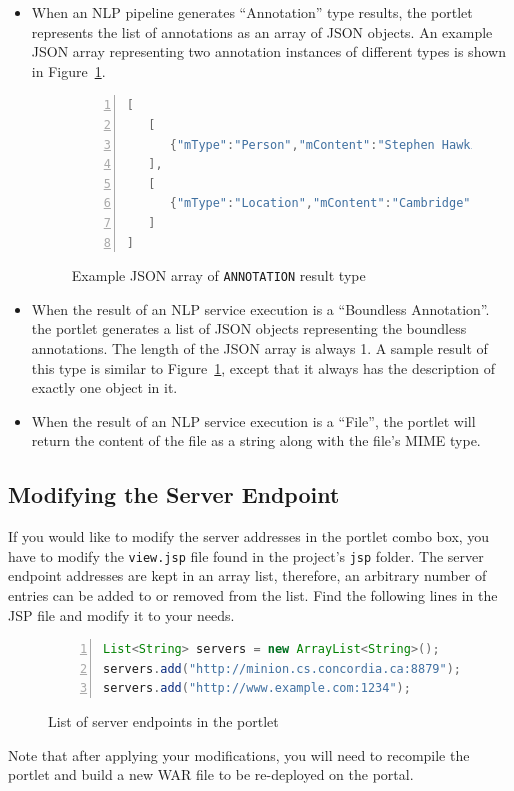 \begin{itemize}
\item When an NLP pipeline generates ``Annotation'' type results, the \sa portlet represents the list of annotations as an array of JSON objects. An example JSON array representing two annotation instances of different types is shown in Figure~\ref{list:json_annot}.
\begin{figure}[h!]
\centering
\begin{lstlisting}[language=Java,numbers=left,xleftmargin=4mm,columns=flexible]
[
   [
      {"mType":"Person","mContent":"Stephen Hawking","mFeatures":{"gender":"male"},"mStart":0,"mEnd":15},
   ],
   [
      {"mType":"Location","mContent":"Cambridge","mFeatures":{"locType":"city"},"mStart":240,"mEnd":249},
   ]
]
\end{lstlisting}
\caption{Example JSON array of \texttt{ANNOTATION} result type}
\label{list:json_annot}
\end{figure}

\item When the result of an NLP service execution is a ``Boundless Annotation''. the \sa portlet generates a list of JSON objects representing the boundless annotations. The length of the JSON array is always 1. A sample result of this type is similar to Figure~\ref{list:json_annot}, except that it always has the description of exactly one object in it.
\item When the result of an NLP service execution is a ``File'', the \sa portlet will return the content of the file as a string along with the file's MIME type.
\end{itemize}

\subsection{Modifying the \sa Server Endpoint}
If you would like to modify the \sa server addresses in the portlet combo box, you have to modify the \texttt{view.jsp} file found in the project's \texttt{jsp} folder. The server endpoint addresses are kept in an array list, therefore, an arbitrary number of entries can be added to or removed from the list. Find the following lines in the JSP file and modify it to your needs.

\begin{figure}[h!]
\centering
\begin{lstlisting}[language=Java,numbers=left,xleftmargin=4mm,columns=flexible]
List<String> servers = new ArrayList<String>();
servers.add("http://minion.cs.concordia.ca:8879");
servers.add("http://www.example.com:1234");
\end{lstlisting}
\caption{List of \sa server endpoints in the portlet}
\label{list:portal_server_addresses}
\end{figure}

Note that after applying your modifications, you will need to recompile the portlet and build a new WAR file to be re-deployed on the portal.

\label{sec:server_change}